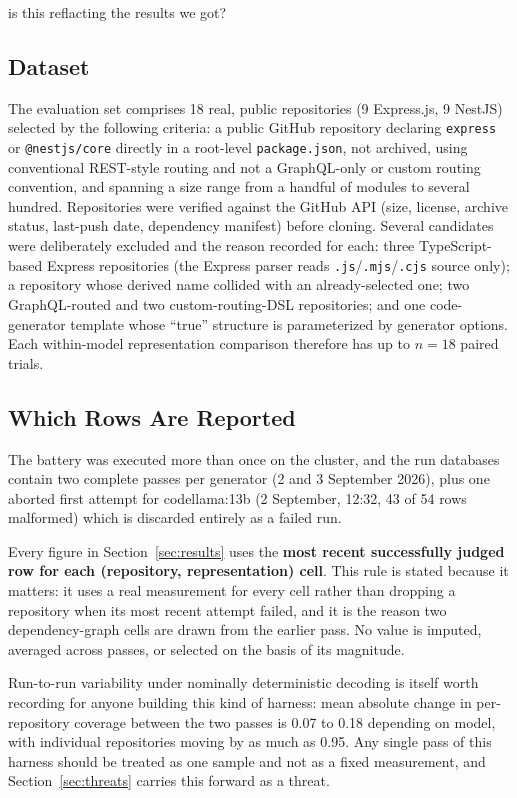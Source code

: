 is this reflacting the results we got?\documentclass[conference]{IEEEtran}
\begin{document}
\subsection{Dataset}
\label{sec:dataset}
The evaluation set comprises 18 real, public repositories (9 Express.js, 9 NestJS) selected by
the following criteria: a public GitHub repository declaring \texttt{express} or
\texttt{@nestjs/core} directly in a root-level \texttt{package.json}, not archived, using
conventional REST-style routing and not a GraphQL-only or custom routing convention, and
spanning a size range from a handful of modules to several hundred. Repositories were verified
against the GitHub API (size, license, archive status, last-push date, dependency manifest)
before cloning. Several candidates were deliberately excluded and the reason recorded for each:
three TypeScript-based Express repositories (the Express parser reads
\texttt{.js}/\texttt{.mjs}/\texttt{.cjs} source only); a repository whose derived name collided
with an already-selected one; two GraphQL-routed and two custom-routing-DSL repositories; and
one code-generator template whose ``true'' structure is parameterized by generator options.
Each within-model representation comparison therefore has up to $n=18$ paired trials.

\subsection{Which Rows Are Reported}
\label{sec:whichrun}
The battery was executed more than once on the cluster, and the run databases contain two
complete passes per generator (2 and 3 September 2026), plus one aborted first attempt for
codellama:13b (2 September, 12:32, 43 of 54 rows malformed) which is discarded entirely as a
failed run.

Every figure in Section~\ref{sec:results} uses the \textbf{most recent successfully judged row
for each (repository, representation) cell}. This rule is stated because it matters: it uses a
real measurement for every cell rather than dropping a repository when its most recent attempt
failed, and it is the reason two dependency-graph cells are drawn from the earlier pass. No
value is imputed, averaged across passes, or selected on the basis of its magnitude.

Run-to-run variability under nominally deterministic decoding is itself worth recording for
anyone building this kind of harness: mean absolute change in per-repository coverage between
the two passes is 0.07 to 0.18 depending on model, with individual repositories moving by as
much as 0.95. Any single pass of this harness should be treated as one sample and not as a fixed
measurement, and Section~\ref{sec:threats} carries this forward as a threat.
\end{document}
